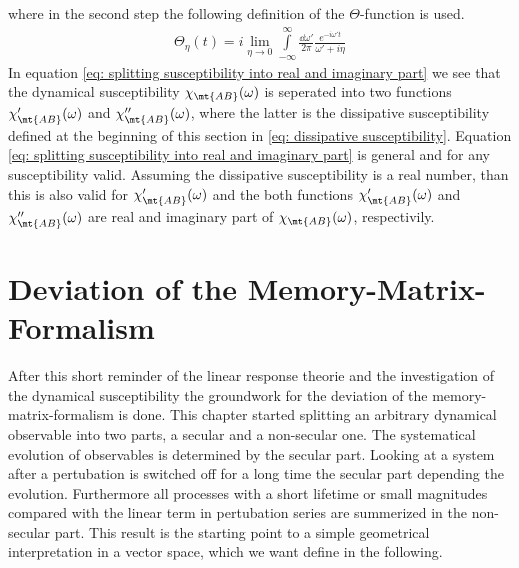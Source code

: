 %
where in the second step the following definition of the $\Theta$-function is used.
%
\begin{align}
	\Theta_{\eta}(t) = i \lim\limits_{\eta \to 0} \int\limits_{-\infty}^{\infty} \frac{\dd{\omega'}}{2\pi} \frac{e^{-i\omega't}}{\omega' + i\eta} 
\end{align}
%
In equation \eqref{eq: splitting susceptibility into real and imaginary part} we see that the dynamical susceptibility $\chi_{\mt{AB}}(\omega)$ is seperated into two functions $\chi'_{\mt{AB}}(\omega)$ and $\chi''_{\mt{AB}}(\omega)$, where the latter is the dissipative susceptibility defined at the beginning of this section in \eqref{eq: dissipative susceptibility}.
Equation \eqref{eq: splitting susceptibility into real and imaginary part} is general and for any susceptibility valid.
Assuming the dissipative susceptibility is a real number, than this is also valid for $\chi'_{\mt{AB}}(\omega)$ and the both functions $\chi'_{\mt{AB}}(\omega)$ and $\chi''_{\mt{AB}}(\omega)$ are real and imaginary part of $\chi_{\mt{AB}}(\omega)$, respectivily.
%
%
%
\section{Deviation of the Memory-Matrix-Formalism}
\label{sec: deviation of the memory-matrix-formalism}
%
%
%
After this short reminder of the linear response theorie and the investigation of the dynamical susceptibility the groundwork for the deviation of the memory-matrix-formalism is done.
This chapter started splitting an arbitrary dynamical observable into two parts, a secular and a non-secular one.
The systematical evolution of observables is determined by the secular part.
Looking at a system after a pertubation is switched off for a long time the secular part depending the evolution.
Furthermore all processes with a short lifetime or small magnitudes compared with the linear term in pertubation series are summerized in the non-secular part.
This result is the starting point to a simple geometrical interpretation in a vector space, which we want define in the following.

